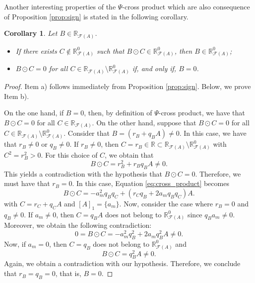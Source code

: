 \documentclass[12pt,a4paper]{article}
\newcommand{\RR}{\mathbb{R}}
\newcommand{\RFA}{\mathbb{R}_{\mathcal{F}(A)}}
\newtheorem{corollary}{Corollary}
\begin{document}
Another interesting properties of the $\Psi$-cross product which are also consequence of Proposition \ref{prop:sign} is stated in the following corollary. 

\begin{corollary}
Let $B \in \RFA$. 
\begin{itemize}
\item[a)] If there exists $C \not\in \RFA^0$ such that $B\odot C \in \RFA^0$, then $B \in \RFA^0$;
\item[b)] $B\odot C = 0$ for all $C \in \RFA \setminus \RFA^0$ if, and only if, $B = 0$.    
\end{itemize}
\end{corollary}
\begin{proof}
Item a) follows immediately from Proposition \ref{prop:sign}. Below, we prove Item b).

On the one hand, if $B=0$, then, by definition of $\Psi$-cross product, we have that 
$B\odot C = 0$ for all $C \in \RFA$. On the other hand, suppose that $B\odot C = 0$ for all $C \in \RFA \setminus \RFA^0$. Consider that $B = (r_B + q_BA)\neq 0$. In this case, we have that $r_B \neq 0$ or $q_B\neq 0$. If $r_B \neq 0$, then $C = r_B \in \RR \subset \RFA \setminus \RFA^0$ with $C^2 = r_B^2 > 0$. For this choice of $C$, we obtain that 
$$
B \odot C = r_B^2 + r_Bq_BA \neq 0.
$$
This yields a contradiction with the hypothesis that $B\odot C = 0$. Therefore, we must have that $r_B = 0$. In this case, Equation \eqref{eq:cross_product} becomes  
$$
B \odot C = -a_m^2q_Bq_C + (r_Cq_B + 2a_mq_Bq_C)A.
$$
with $C = r_C + q_CA$ and $[A]_1 = \{a_m\}$.
Now, consider the case where $r_B = 0$ and $q_B \neq 0$. 
If $a_m\neq 0$, then $C = q_BA$ does not belong to  $\RFA^0$ since $q_Ba_m \neq 0$. 
Moreover, we obtain the following contradiction:
$$
0 = B\odot C = -a_m^2q_B^2 + 2a_mq_B^2A \neq 0.
$$
Now, if $a_m = 0$, then $C = q_B$ does not belong to $\RFA^0$ and 
$$
B\odot C = q_B^2A \neq 0.
$$
Again, we obtain a contradiction with our hypothesis. Therefore, we conclude that $r_B = q_B = 0$, that is, $B = 0$.
\end{proof}

\end{document}
